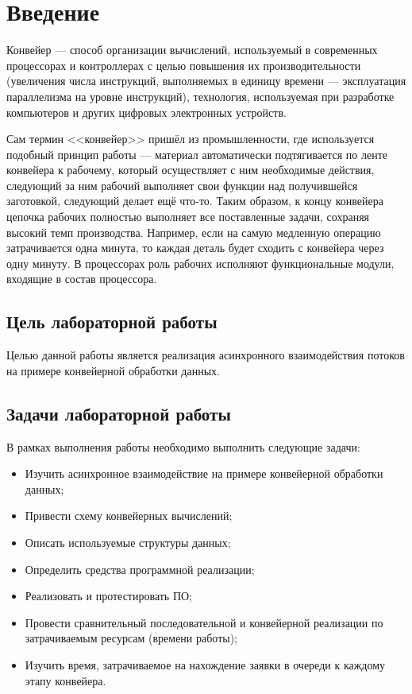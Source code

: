 \documentclass[12pt]{report}
\begin{document}
    
    \tableofcontents

    \newpage
    \chapter*{Введение}
    Конвейер — способ организации вычислений, используемый в современных процессорах и контроллерах с целью повышения их производительности (увеличения числа инструкций, выполняемых в единицу времени — эксплуатация параллелизма на уровне инструкций), технология, используемая при разработке компьютеров и других цифровых электронных устройств.
    
    Сам термин <<конвейер>> пришёл из промышленности, где используется подобный принцип работы — материал автоматически подтягивается по ленте конвейера к рабочему, который осуществляет с ним необходимые действия, следующий за ним рабочий выполняет свои функции над получившейся заготовкой, следующий делает ещё что-то. Таким образом, к концу конвейера цепочка рабочих полностью выполняет все поставленные задачи, сохраняя высокий темп производства. Например, если на самую медленную операцию затрачивается одна минута, то каждая деталь будет сходить с конвейера через одну минуту. В процессорах роль рабочих исполняют функциональные модули, входящие в состав процессора.
    
    \section*{Цель лабораторной работы}
    Целью данной работы является реализация асинхронного взаимодействия потоков на примере конвейерной обработки данных.
    
    \section*{Задачи лабораторной работы}
    
   В рамках выполнения работы необходимо выполнить следующие задачи:
    \begin{itemize}
    	\item Изучить асинхронное взаимодействие на примере конвейерной обработки данных;
    	\item Привести схему конвейерных вычислений;
    	\item Описать используемые структуры данных;
    	\item Определить средства программной реализации;
    	\item Реализовать и протестировать ПО;
    	\item Провести сравнительный последовательной и конвейерной реализации по затрачиваемым ресурсам (времени работы);
    	\item Изучить время, затрачиваемое на нахождение заявки в очереди к каждому этапу конвейера.
    \end{itemize}
    \newpage
    
\end{document}
